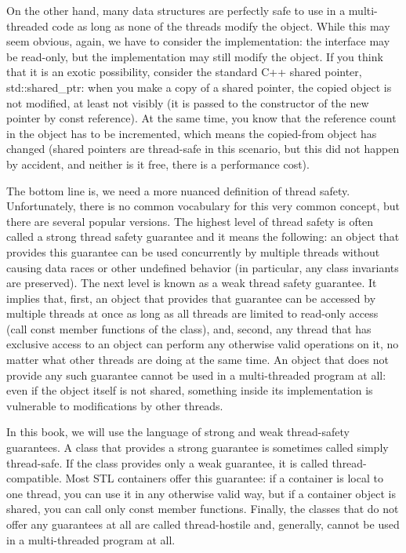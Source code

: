 On the other hand, many data structures are perfectly safe to use in a multi-threaded code as long as none of the threads modify the object. While this may seem obvious, again, we have to consider the implementation: the interface may be read-only, but the implementation may still modify the object. If you think that it is an exotic possibility, consider the standard C++ shared pointer, std::shared\_ptr: when you make a copy of a shared pointer, the copied object is not modified, at least not visibly (it is passed to the constructor of the new pointer by const reference). At the same time, you know that the reference count in the object has to be incremented, which means the copied-from object has changed (shared pointers are thread-safe in this scenario, but this did not happen by accident, and neither is it free, there is a performance cost).

The bottom line is, we need a more nuanced definition of thread safety. Unfortunately, there is no common vocabulary for this very common concept, but there are several popular versions. The highest level of thread safety is often called a strong thread safety guarantee and it means the following: an object that provides this guarantee can be used concurrently by multiple threads without causing data races or other undefined behavior (in particular, any class invariants are preserved). The next level is known as a weak thread safety guarantee. It implies that, first, an object that provides that guarantee can be accessed by multiple threads at once as long as all threads are limited to read-only access (call const member functions of the class), and, second, any thread that has exclusive access to an object can perform any otherwise valid operations on it, no matter what other threads are doing at the same time. An object that does not provide any such guarantee cannot be used in a multi-threaded program at all: even if the object itself is not shared, something inside its implementation is vulnerable to modifications by other threads.

In this book, we will use the language of strong and weak thread-safety guarantees. A class that provides a strong guarantee is sometimes called simply thread-safe. If the class provides only a weak guarantee, it is called thread-compatible. Most STL containers offer this guarantee: if a container is local to one thread, you can use it in any otherwise valid way, but if a container object is shared, you can call only const member functions. Finally, the classes that do not offer any guarantees at all are called thread-hostile and, generally, cannot be used in a multi-threaded program at all.

